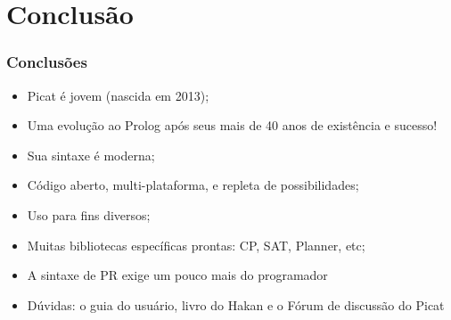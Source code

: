 \section{Conclusão}
\begin{frame}

    \frametitle{Conclusões}

    \begin{itemize}
      \item Picat é jovem (nascida em 2013); 
      \pause
      \item Uma evolução ao Prolog após seus mais de 40 anos de existência e sucesso!
      \pause
      \item Sua sintaxe é moderna;
      \pause
      \item Código aberto, multi-plataforma, e repleta de possibilidades;
      \pause
      \item Uso para fins diversos;
      \pause
      \item Muitas bibliotecas específicas prontas: CP, SAT, Planner, etc;
      \pause
      \item A sintaxe de PR exige um pouco mais do programador
      \pause
      \item Dúvidas: o guia do usuário, livro do Hakan e o Fórum de discussão do Picat

    \end{itemize}
\end{frame}


